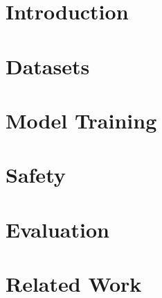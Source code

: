 \documentclass[11pt]{article}
\newcommand{\system}{\textsc{Aurora-M}}
\begin{document}



\section{Introduction}


\section{Datasets}




\section{Model Training}




\section{Safety}\label{sec:safety}


\section{Evaluation}\label{sec:experiments}




\section{Related Work}

\end{document}

